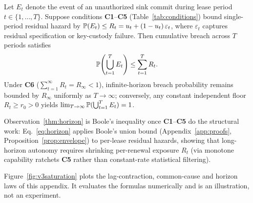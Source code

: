 \begin{observation}\label{thm:horizon}
Let \(E_t\) denote the event of an unauthorized sink commit during lease period \(t \in \{1,\dots,T\}\). Suppose conditions \textbf{C1}--\textbf{C5} (Table~\ref{tab:conditions}) bound single-period residual hazard by \(\mathbb{P}(E_t) \le R_t = u_t + (1 - u_t)\,\varepsilon_t\), where \(\varepsilon_t\) captures residual specification or key-custody failure. Then cumulative breach across \(T\) periods satisfies
\begin{equation}\label{eq:horizon}
  \mathbb{P}\!\left(\bigcup_{t=1}^T E_t\right) \le \sum_{t=1}^T R_t.
\end{equation}
Under \textbf{C6} (\(\sum_{t=1}^\infty R_t = R_\infty < 1\)), infinite-horizon breach probability remains bounded by \(R_\infty\) uniformly as \(T \to \infty\); conversely, any constant independent floor \(R_t \ge r_0 > 0\) yields \(\lim_{T\to\infty}\mathbb{P}(\bigcup_{t=1}^T E_t) = 1\).
\end{observation}

Observation~\ref{thm:horizon} is Boole's inequality once \textbf{C1}--\textbf{C5} do the structural work: Eq.~\eqref{eq:horizon} applies Boole's union bound (Appendix~\ref{app:proofs}, Proposition~\ref{prop:envelope}) to per-lease residual hazards, showing that long-horizon autonomy requires shrinking per-renewal exposure \(R_t\) (via monotone capability ratchets \textbf{C5} rather than constant-rate statistical filtering).

Figure~\ref{fig:v3saturation} plots the lag-contraction, common-cause and horizon laws of this appendix. It evaluates the formulas numerically and is an illustration, not an experiment.


